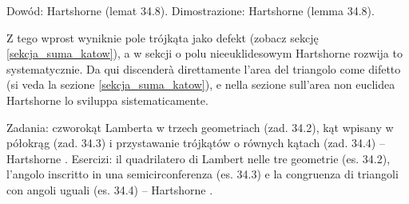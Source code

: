 Dowód: Hartshorne \cite[s. 311--312]{hartshorne_2000} (lemat 34.8). %
Dimostrazione: Hartshorne \cite[p. 311--312]{hartshorne_2000} (lemma 34.8). %

Z tego wprost wyniknie pole trójkąta jako defekt (zobacz sekcję \ref{sekcja_suma_katow}), a w sekcji o polu nieeuklidesowym Hartshorne \cite[s. 326 nn.]{hartshorne_2000} rozwija to systematycznie. %
Da qui discenderà direttamente l'area del triangolo come difetto (si veda la sezione \ref{sekcja_suma_katow}), e nella sezione sull'area non euclidea Hartshorne \cite[p. 326 e segg.]{hartshorne_2000} lo sviluppa sistematicamente. %

Zadania: czworokąt Lamberta w trzech geometriach (zad. 34.2), kąt wpisany w półokrąg (zad. 34.3) i przystawanie trójkątów o równych kątach (zad. 34.4) -- Hartshorne \cite[s. 316]{hartshorne_2000}. %
Esercizi: il quadrilatero di Lambert nelle tre geometrie (es. 34.2), l'angolo inscritto in una semicirconferenza (es. 34.3) e la congruenza di triangoli con angoli uguali (es. 34.4) -- Hartshorne \cite[p. 316]{hartshorne_2000}. %
